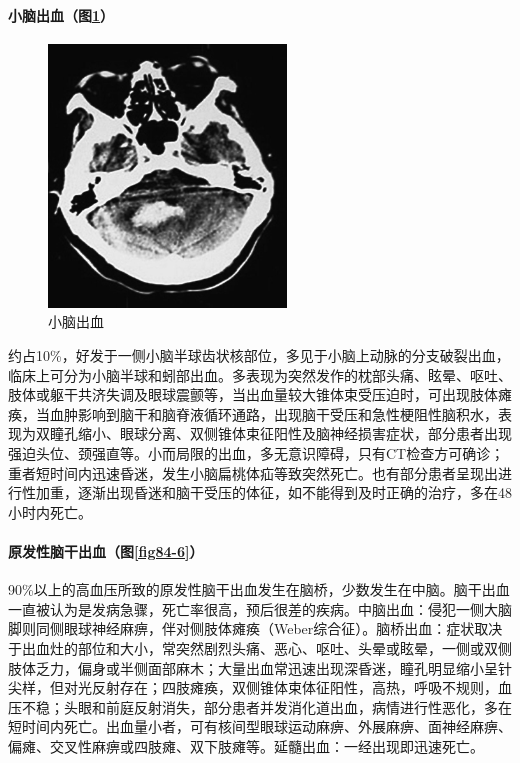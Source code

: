 \paragraph{小脑出血（图\ref{fig84-5}）}

\begin{figure}[!htbp]
 \centering
 \includegraphics[width=2.48958in,height=2.75in]{./images/Image00380.jpg}
 \captionsetup{justification=centering}
 \caption{小脑出血}
 \label{fig84-5}
  \end{figure} 

约占10\%，好发于一侧小脑半球齿状核部位，多见于小脑上动脉的分支破裂出血，临床上可分为小脑半球和蚓部出血。多表现为突然发作的枕部头痛、眩晕、呕吐、肢体或躯干共济失调及眼球震颤等，当出血量较大锥体束受压迫时，可出现肢体瘫痪，当血肿影响到脑干和脑脊液循环通路，出现脑干受压和急性梗阻性脑积水，表现为双瞳孔缩小、眼球分离、双侧锥体束征阳性及脑神经损害症状，部分患者出现强迫头位、颈强直等。小而局限的出血，多无意识障碍，只有CT检查方可确诊；重者短时间内迅速昏迷，发生小脑扁桃体疝等致突然死亡。也有部分患者呈现出进行性加重，逐渐出现昏迷和脑干受压的体征，如不能得到及时正确的治疗，多在48小时内死亡。

\paragraph{原发性脑干出血（图\ref{fig84-6}）}

90\%以上的高血压所致的原发性脑干出血发生在脑桥，少数发生在中脑。脑干出血一直被认为是发病急骤，死亡率很高，预后很差的疾病。中脑出血：侵犯一侧大脑脚则同侧眼球神经麻痹，伴对侧肢体瘫痪（Weber综合征）。脑桥出血：症状取决于出血灶的部位和大小，常突然剧烈头痛、恶心、呕吐、头晕或眩晕，一侧或双侧肢体乏力，偏身或半侧面部麻木；大量出血常迅速出现深昏迷，瞳孔明显缩小呈针尖样，但对光反射存在；四肢瘫痪，双侧锥体束体征阳性，高热，呼吸不规则，血压不稳；头眼和前庭反射消失，部分患者并发消化道出血，病情进行性恶化，多在短时间内死亡。出血量小者，可有核间型眼球运动麻痹、外展麻痹、面神经麻痹、偏瘫、交叉性麻痹或四肢瘫、双下肢瘫等。延髓出血：一经出现即迅速死亡。

